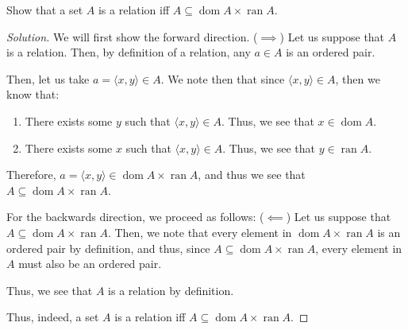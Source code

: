 \documentclass{article}
\newenvironment{solution}{\begin{proof}[Solution]}{\end{proof}}
\renewcommand\qedsymbol{$\blacksquare$}
\newenvironment{innerproof}{\renewcommand{\qedsymbol}{$\square$}\proof}{\endproof}
\DeclareMathOperator*{\dom}{\mathrm{dom}}
\DeclareMathOperator*{\ran}{\mathrm{ran}}
\newcommand{\ang}[1]{\langle {#1} \rangle}
\begin{document}
	\setcounter{subsection}{6}
	\begin{hw}
		Show that a set $A$ is a relation iff $A \subseteq \dom A \times \ran A$.
	\end{hw}
	\begin{solution}
		We will first show the forward direction.
		\begin{innerproof}($\implies$)
			Let us suppose that $A$ is a relation. Then, by definition of a relation, any $a \in A$ is an ordered pair.
			
			Then, let us take $a = \ang{x,y} \in A$. We note then that since $\ang{x,y} \in A$, then we know that:
			\begin{enumerate}
				\item There exists some $y$ such that $\ang{x,y} \in A$. Thus, we see that $x \in \dom A$.
				\item There exists some $x$ such that $\ang{x,y} \in A$. Thus, we see that $y \in \ran A$. 
			\end{enumerate}
			
			Therefore, $a = \ang{x,y} \in \dom A \times \ran A$, and thus we see that $A \subseteq \dom A \times \ran A$.
		\end{innerproof}
		
		For the backwards direction, we proceed as follows:
		\begin{innerproof}($\impliedby$)
			Let us suppose that $A \subseteq \dom A \times \ran A$. Then, we note that every element in $\dom A \times \ran A$ is an ordered pair by definition, and thus, since $A \subseteq \dom A \times \ran A$, every element in $A$ must also be an ordered pair.
			
			Thus, we see that $A$ is a relation by definition.
		\end{innerproof}
		
		Thus, indeed, a set $A$ is a relation iff $A \subseteq \dom A \times \ran A$.
	\end{solution}
	
\end{document}
